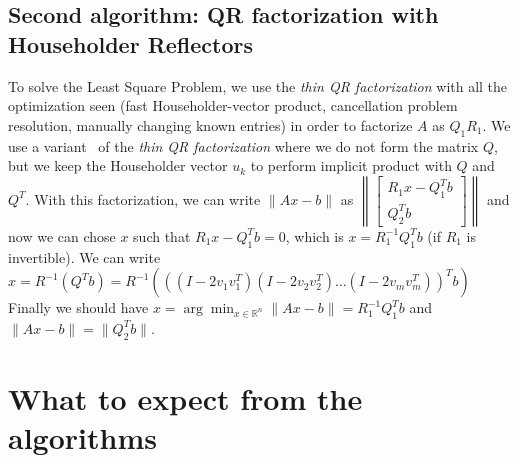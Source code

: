\documentclass{article}
\begin{document}
\subsection{Second algorithm: QR factorization with Householder Reflectors}\label{subsec:qr-factorization-with-householder-reflectors}
To solve the Least Square Problem, we use the \textit{thin QR factorization} with all the optimization seen (fast Householder-vector product, cancellation problem resolution, manually changing known entries) in order to factorize $A$ as $Q_{1}R_{1}$.
We use a variant~\cite{nla} of the \textit{thin QR factorization} where we do not form the matrix $Q$, but we keep the Householder vector $u_{k}$ to perform implicit product with $Q$ and $Q^{T}$.
With this factorization, we can write $\|Ax - b\|$ as $\left\lVert \begin{bmatrix} R_{1}x - Q_{1}^{T}b \\ Q_{2}^{T}b\end{bmatrix} \right\lVert$
and now we can chose $x$ such that $R_{1}x - Q_{1}^{T}b = 0$, which is $x = R_{1}^{-1}Q_{1}^{T}b$ (if $R_{1}$ is invertible).
We can write $x = R^{-1}(Q^{T}b) = R^{-1}(((I-2v_{1}v_{1}^{T})(I-2v_{2}v_{2}^{T})\dots(I-2v_{m}v_{m}^{T}))^{T}b)$
Finally we should have $x  = \arg\!\min_{x \in  \mathds{R}^n}\|Ax - b\| = R_{1}^{-1}Q_{1}^{T}b$ and $\|Ax - b\| = \|Q_{2}^{T}b\|$.

\section{What to expect from the algorithms}\label{sec:what-to-expect-from-the-algorithms}
\end{document}
